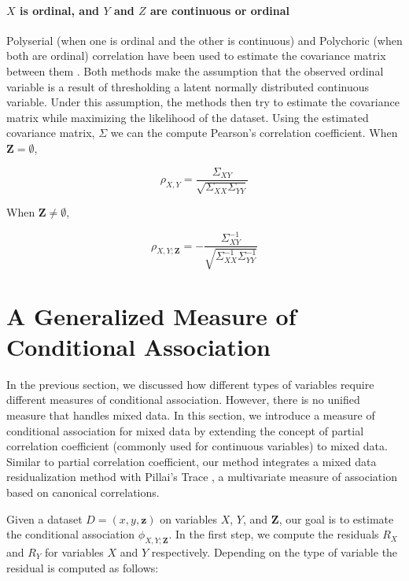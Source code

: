\documentclass{uai2025} %
\begin{document}
\paragraph{$ X $ is ordinal, and $ Y $ and $ Z $  are continuous or ordinal}

Polyserial (when one is ordinal and the other is continuous) and Polychoric
(when both are ordinal) correlation have been used to estimate the covariance
matrix between them \citep{Poon1987}. Both methods make the assumption that the
observed ordinal variable is a result of thresholding a latent normally
distributed continuous variable. Under this assumption, the methods then try to
estimate the covariance matrix while maximizing the likelihood of the dataset.
Using the estimated covariance matrix, $ \Sigma $ we can the compute Pearson's
correlation coefficient. When $ \bm{Z} = \emptyset $,

\begin{equation}
	\rho_{X, Y} = \frac{\Sigma_{XY}}{\sqrt{\Sigma_{XX} \Sigma_{YY}}}
\end{equation}

When $ \bm{Z} \neq \emptyset $, 

\begin{equation}
	\rho_{X, Y; \bm{Z}} = - \frac{\Sigma^{-1}_{XY}}{\sqrt{\Sigma^{-1}_{XX} \Sigma^{-1}_{YY}}}
\end{equation}

\section{A Generalized Measure of Conditional Association}
\label{sec:mixed_association}

In the previous section, we discussed how different types of variables require
different measures of conditional association. However, there is no unified
measure that handles mixed data. In this section, we introduce a measure of conditional
association for mixed data by extending the concept of partial correlation
coefficient (commonly used for continuous variables) to mixed data. Similar to
partial correlation coefficient, our method integrates a mixed data
residualization method \citep{Ankan2023} with Pillai's Trace
\citep{Pillai1955}, a multivariate measure of association based on canonical
correlations.
 
Given a dataset $ D = (x, y, \bm{z}) $ on variables $ X $, $ Y $, and $ \bm{Z}
$, our goal is to estimate the conditional association $ \phi_{X, Y; \bm{Z}} $. 
In the first step, we compute the residuals $ R_X $ and $ R_Y $ for variables
$ X $ and $ Y $ respectively. Depending on the type of variable the residual
is computed as follows:
\end{document}
